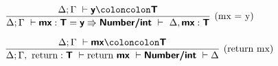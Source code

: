 \documentclass[a4paper]{article}
\newcommand{\kw}[1]{\textsf{\textbf{#1}}}
\newcommand{\colcol}{\coloncolon}
\newcommand{\yield}{\Rrightarrow}
\begin{document}
\vspace{2\baselineskip}

$\infer[\text{(mx = y)}]%
{\Delta;\Gamma~\vdash \kw{mx} : \kw{T} = \kw{y} \yield \kw{Number/int}~ \vdash~\Delta,\kw{mx}:\kw{T} }%
{\Delta; \Gamma~\vdash \kw{y}\colcol\kw{T}}$

\vspace{2\baselineskip}

$\infer[\text{(return mx)}]%
{\Delta;\Gamma, ~\text{return}:\kw{T}~\vdash\text{return}~\kw{mx}~\vdash \kw{Number/int}~ \vdash \Delta}%
{\Delta; \Gamma~\vdash \kw{mx}\colcol\kw{T}}$
\end{document}
